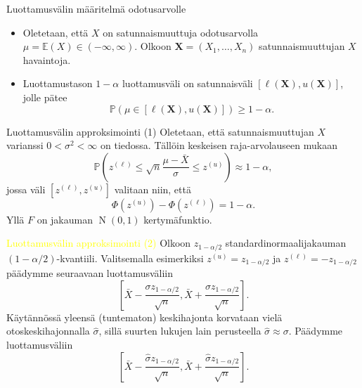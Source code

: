 \documentclass{beamer}
\DeclareMathOperator{\n}{\mathrm N}
\begin{document}
\begin{frame}{Luottamusvälin määritelmä odotusarvolle}
  \begin{itemize}
    \item Oletetaan, että $X$ on satunnaismuuttuja odotusarvolla $\mu =
    \mathbb{E}\left(X\right)\in(-\infty, \infty)$. Olkoon $\bm X = (X_1, \ldots,
    X_n)$ satunnaismuuttujan $X$ havaintoja.
    \pause
    \item Luottamustason $1-\alpha$ luottamusväli on satunnaisväli
    $\left[\ell\left(\bm X\right), u\left(\bm X\right)\right]$, jolle pätee
    \begin{equation*}
      \mathbb{P}\left(\mu\in\left[\ell\left(\bm X\right), u\left(\bm
      X\right)\right]\right) \geq 1 - \alpha.
    \end{equation*}
  \end{itemize}
\end{frame}


\begin{frame}{Luottamusvälin approksimointi (1)}
  Oletetaan, että satunnaismuuttujan $X$ varianssi $0 < \sigma^2 < \infty$ on
  tiedossa. Tällöin keskeisen raja-arvolauseen mukaan
  \begin{equation*}
    \mathbb{P}\left(z^{(\ell)} \leq \sqrt{n}\frac{\mu - \bar X}{\sigma}
    \leq z^{(u)}\right) \approx 1 - \alpha,
  \end{equation*}
  \pause
  jossa väli $[z^{(\ell)}, z^{(u)}]$ valitaan niin, että
  \begin{equation*}
    \Phi(z^{(u)}) - \Phi(z^{(\ell)}) = 1-\alpha.
  \end{equation*}
  Yllä $F$ on jakauman $\n\left(0,1\right)$ kertymäfunktio.
\end{frame}


\begin{frame}{\textcolor{yellow}{Luottamusvälin approksimointi (2)}}
  Olkoon $z_{1-\alpha/2}$ standardinormaalijakauman $(1-\alpha/2)$-kvantiili.
  Valitsemalla esimerkiksi $z^{(u)} = z_{1 - \alpha/2}$ ja $z^{(\ell)} = -z_{1 -
  \alpha/2}$ päädymme seuraavaan luottamusväliin
  \begin{equation*}
    \left[\bar X - \frac{\sigma z_{1 - \alpha/2}}{\sqrt{n}},
    \bar X + \frac{\sigma z_{1 - \alpha/2}}{\sqrt{n}}\right].
  \end{equation*}
  \pause
  Käytännössä yleensä (tuntematon) keskihajonta korvataan vielä
  otoskeskihajonnalla $\hat\sigma$, sillä suurten lukujen lain perusteella
  $\hat\sigma\approx\sigma$. Päädymme luottamusväliin
  \begin{equation*}
    \left[\bar X - \frac{\hat\sigma z_{1 - \alpha/2}}{\sqrt{n}},
    \bar X + \frac{\hat\sigma z_{1 - \alpha/2}}{\sqrt{n}}\right].
  \end{equation*}
\end{frame}
\end{document}
